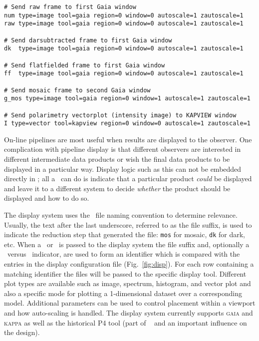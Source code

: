 \documentclass[final,authoryear,5p,times,twocolumn]{elsarticle}
\begin{document}
\begin{figure*}
{\small
\begin{verbatim}
# Send raw frame to first Gaia window
num type=image tool=gaia region=0 window=0 autoscale=1 zautoscale=1
raw type=image tool=gaia region=0 window=0 autoscale=1 zautoscale=1

# Send darsubtracted frame to first Gaia window
dk  type=image tool=gaia region=0 window=0 autoscale=1 zautoscale=1

# Send flatfielded frame to first Gaia window
ff  type=image tool=gaia region=0 window=0 autoscale=1 zautoscale=1

# Send mosaic frame to second Gaia window
g_mos type=image tool=gaia region=0 window=1 autoscale=1 zautoscale=1

# Send polarimetry vectorplot (intensity image) to KAPVIEW window
I type=vector tool=kapview region=0 window=0 autoscale=1 zautoscale=1
\end{verbatim}
}
\caption{Sample display configuration file used as the default for the
  UFTI instrument.}
\label{fig:disp}
\end{figure*}

On-line pipelines are most useful when results are displayed to the
observer. One complication with pipeline display is that different
observers are interested in different intermediate data products or
wish the final data products to be displayed in a particular
way. Display logic such as this can not be embedded directly in
\primitives; all a \primitive\ can do is indicate that a particular
product \emph{could} be displayed and leave it to a different system
to decide \emph{whether} the product should be displayed and how to
do so.

The display system uses the \oracdr\ file naming convention to
determine relevance. Usually, the text after the last underscore,
referred to as the file suffix, is used to indicate the reduction step
that generated the file: \texttt{mos} for mosaic, \texttt{dk} for
dark, etc. When a \Frame\ or \Group\ is passed to the display system
the file suffix and, optionally a \Group\ versus \Frame\ indicator,
are used to form an identifier which is compared with the entries in
the display configuration file (Fig.\ \ref{fig:disp}). For each row
containing a matching identifier the files will be passed to the
specific display tool. Different plot types are available such as
image, spectrum, histogram, and vector plot and also a specific mode
for plotting a 1-dimensional dataset over a corresponding model. Additional
parameters can be used to control placement within a viewport and how
auto-scaling is handled. The display system currently supports \textsc{gaia}
\citep[][]{2009ASPC..411..575D} and \textsc{kappa}
\citep[][]{SUN95} as well as the historical P4 tool
(part of \cgsdr\ \citep{SUN27} and an important influence on the
design).
\end{document}
